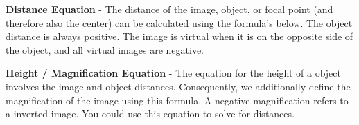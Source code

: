\documentclass{article}
\begin{document}
\begin{minipage}{0.32\textwidth}
{}
\end{minipage}
\vspace{10pt}

\noindent\textbf{Distance Equation} - The distance of the image, object, or focal point (and therefore also the center) can be calculated using the formula's below. The object distance is always positive. The image is virtual when it is on the opposite side of the object, and all virtual images are negative.
\begin{center}
\end{center}
\vspace{10pt}

\noindent\textbf{Height / Magnification Equation} - The equation for the height of a object involves the image and object distances. Consequently, we additionally define the magnification of the image using this formula. A negative magnification refers to a inverted image. You could use this equation to solve for distances.
\begin{center}
\end{center}
\end{document}
